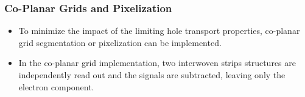 \subsubsection{Co-Planar Grids and Pixelization}
\begin{itemize}
    \item To minimize the impact of the limiting hole transport properties, co-planar grid segmentation or pixelization can be implemented. 
    \item In the co-planar grid implementation, two interwoven strips structures are independently read out and the signals are subtracted, leaving only the electron component. 
\end{itemize}